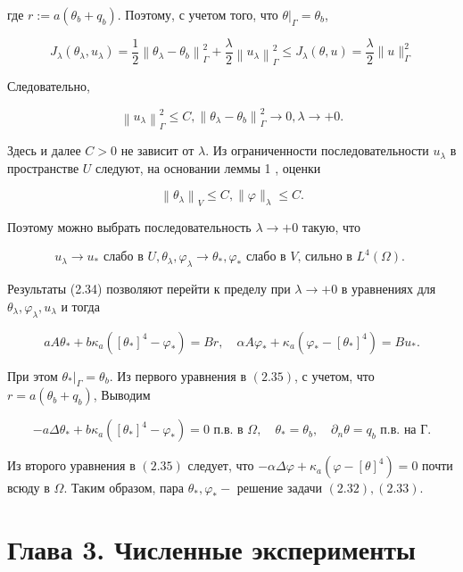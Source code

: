\documentclass[10pt]{article}
\begin{document}
где $r:=a\left(\theta_{b}+q_{b}\right)$. Поэтому, с учетом того, что $\left.\theta\right|_{\Gamma}=\theta_{b}$,

$$
J_{\lambda}\left(\theta_{\lambda}, u_{\lambda}\right)=\frac{1}{2}\left\|\theta_{\lambda}-\theta_{b}\right\|_{\Gamma}^{2}+\frac{\lambda}{2}\left\|u_{\lambda}\right\|_{\Gamma}^{2} \leqslant J_{\lambda}(\theta, u)=\frac{\lambda}{2}\|u\|_{\Gamma}^{2}
$$

Следовательно,

$$
\left\|u_{\lambda}\right\|_{\Gamma}^{2} \leqslant C,\left\|\theta_{\lambda}-\theta_{b}\right\|_{\Gamma}^{2} \rightarrow 0, \lambda \rightarrow+0 .
$$

Здесь и далее $C>0$ не зависит от $\lambda$. Из ограниченности последовательности $u_{\lambda}$ в пространстве $U$ следуют, на основании леммы 1 , оценки

$$
\left\|\theta_{\lambda}\right\|_{V} \leqslant C,\|\varphi\|_{\lambda} \leqslant C .
$$

Поэтому можно выбрать последовательность $\lambda \rightarrow+0$ такую, что

$$
u_{\lambda} \rightarrow u_{*} \text { слабо в } U, \theta_{\lambda}, \varphi_{\lambda} \rightarrow \theta_{*}, \varphi_{*} \text { слабо в } V \text {, сильно в } L^{4}(\Omega) \text {. }
$$

Результаты (2.34) позволяют перейти к пределу при $\lambda \rightarrow+0$ в уравнениях для $\theta_{\lambda}, \varphi_{\lambda}, u_{\lambda}$ и тогда

$$
a A \theta_{*}+b \kappa_{a}\left(\left[\theta_{*}\right]^{4}-\varphi_{*}\right)=B r, \quad \alpha A \varphi_{*}+\kappa_{a}\left(\varphi_{*}-\left[\theta_{*}\right]^{4}\right)=B u_{*} .
$$

При этом $\left.\theta_{*}\right|_{\Gamma}=\theta_{b}$. Из первого уравнения в $(2.35)$, с учетом, что $r=a\left(\theta_{b}+q_{b}\right)$, Выводим

$$
-a \Delta \theta_{*}+b \kappa_{a}\left(\left[\theta_{*}\right]^{4}-\varphi_{*}\right)=0 \text { п.в. в } \Omega, \quad \theta_{*}=\theta_{b}, \quad \partial_{n} \theta=q_{b} \text { п.в. на } Г .
$$

Из второго уравнения в $(2.35)$ следует, что $-\alpha \Delta \varphi+\kappa_{a}\left(\varphi-[\theta]^{4}\right)=0$ почти всюду в $\Omega$. Таким образом, пара $\theta_{*}, \varphi_{*}-$ решение задачи $(2.32),(2.33)$.

\section{Глава 3. Численные эксперименты}
\end{document}
